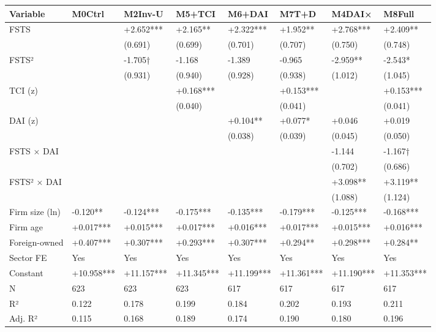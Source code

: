 \documentclass[12pt,a4paper]{article}
\begin{document}
\begin{longtable}[]{@{}llllllll@{}}
\toprule\noalign{}
Variable & M0Ctrl & M2Inv-U & M5+TCI & M6+DAI & M7T+D & M4DAI× &
M8Full \\
\midrule\noalign{}
\endhead
\bottomrule\noalign{}
\endlastfoot
FSTS & & +2.652*** & +2.165** & +2.322*** & +1.952** & +2.768*** &
+2.409** \\
& & (0.691) & (0.699) & (0.701) & (0.707) & (0.750) & (0.748) \\
FSTS² & & -1.705† & -1.168 & -1.389 & -0.965 & -2.959** & -2.543* \\
& & (0.931) & (0.940) & (0.928) & (0.938) & (1.012) & (1.045) \\
TCI (z) & & & +0.168*** & & +0.153*** & & +0.153*** \\
& & & (0.040) & & (0.041) & & (0.041) \\
DAI (z) & & & & +0.104** & +0.077* & +0.046 & +0.019 \\
& & & & (0.038) & (0.039) & (0.045) & (0.050) \\
FSTS × DAI & & & & & & -1.144 & -1.167† \\
& & & & & & (0.702) & (0.686) \\
FSTS² × DAI & & & & & & +3.098** & +3.119** \\
& & & & & & (1.088) & (1.124) \\
Firm size (ln) & -0.120** & -0.124*** & -0.175*** & -0.135*** &
-0.179*** & -0.125*** & -0.168*** \\
Firm age & +0.017*** & +0.015*** & +0.017*** & +0.016*** & +0.017*** &
+0.015*** & +0.016*** \\
Foreign-owned & +0.407*** & +0.307*** & +0.293*** & +0.307*** & +0.294**
& +0.298*** & +0.284** \\
Sector FE & Yes & Yes & Yes & Yes & Yes & Yes & Yes \\
Constant & +10.958*** & +11.157*** & +11.345*** & +11.199*** &
+11.361*** & +11.190*** & +11.353*** \\
N & 623 & 623 & 623 & 617 & 617 & 617 & 617 \\
R² & 0.122 & 0.178 & 0.199 & 0.184 & 0.202 & 0.193 & 0.211 \\
Adj. R² & 0.115 & 0.168 & 0.189 & 0.174 & 0.190 & 0.180 & 0.196 \\
\end{longtable}
\end{document}
